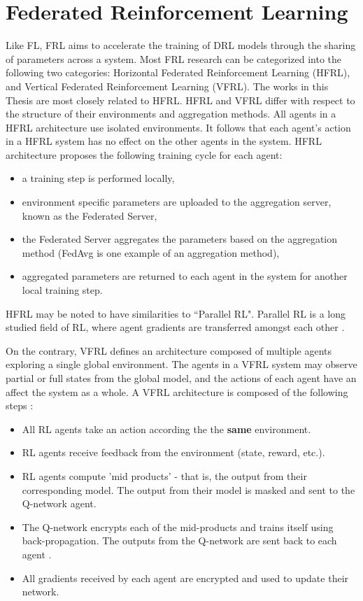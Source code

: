 \section{Federated Reinforcement Learning}
Like FL, FRL aims to accelerate the training of DRL models through the sharing of parameters
across a system. Most FRL research can be categorized into the following two categories:
Horizontal Federated Reinforcement Learning (HFRL), and Vertical Federated Reinforcement
Learning (VFRL).  The works in this Thesis are most closely related to HFRL.  HFRL and VFRL
differ with respect to the structure of their environments and aggregation methods.  All
agents in a HFRL architecture use isolated environments. It follows that each agent's action
in a HFRL system has no effect on the other agents in the system.  HFRL architecture
proposes the following training cycle for each agent:

\begin{itemize}
    \item a training step is performed locally,
    \item environment specific parameters are uploaded to the aggregation server,
    known as the Federated Server,
    \item the Federated Server aggregates the parameters based on the aggregation
    method (FedAvg is one example of an aggregation method),
    \item aggregated parameters are returned to each agent in the system for
    another local training step.
\end{itemize}

HFRL may be noted to have similarities to ``Parallel RL".  Parallel RL is a long studied
field of RL, where agent gradients are transferred amongst each other
\cite{Lim2020, Nadiger2019}.

On the contrary, VFRL defines an architecture composed
of multiple agents exploring a single global environment. The agents in a VFRL system
may observe partial or full states from the global model, and the actions of each agent
have an affect the system as a whole. A VFRL architecture is composed of the following steps \cite{IntelAI19}:

\begin{itemize}
    \item All RL agents take an action according the the \textbf{same} environment.
    \item RL agents receive feedback from the environment (state, reward, etc.).
    \item RL agents compute 'mid products' - that is, the output from their corresponding model.
    The output from their model is masked and sent to the Q-network agent.
    \item The Q-network encrypts each of the mid-products and trains itself using back-propagation.
    The outputs from the Q-network are sent back to each agent \cite{IntelAI19}.
    \item All gradients received by each agent are encrypted and used to update their network.
\end{itemize}

